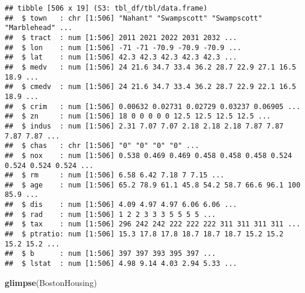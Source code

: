 \documentclass[
]{book}
\newenvironment{Shaded}{\begin{snugshade}}{\end{snugshade}}
\newcommand{\FunctionTok}[1]{\textcolor[rgb]{0.13,0.29,0.53}{\textbf{#1}}}
\newcommand{\NormalTok}[1]{#1}
\begin{document}
\begin{verbatim}
## tibble [506 x 19] (S3: tbl_df/tbl/data.frame)
##  $ town   : chr [1:506] "Nahant" "Swampscott" "Swampscott" "Marblehead" ...
##  $ tract  : num [1:506] 2011 2021 2022 2031 2032 ...
##  $ lon    : num [1:506] -71 -71 -70.9 -70.9 -70.9 ...
##  $ lat    : num [1:506] 42.3 42.3 42.3 42.3 42.3 ...
##  $ medv   : num [1:506] 24 21.6 34.7 33.4 36.2 28.7 22.9 27.1 16.5 18.9 ...
##  $ cmedv  : num [1:506] 24 21.6 34.7 33.4 36.2 28.7 22.9 22.1 16.5 18.9 ...
##  $ crim   : num [1:506] 0.00632 0.02731 0.02729 0.03237 0.06905 ...
##  $ zn     : num [1:506] 18 0 0 0 0 0 12.5 12.5 12.5 12.5 ...
##  $ indus  : num [1:506] 2.31 7.07 7.07 2.18 2.18 2.18 7.87 7.87 7.87 7.87 ...
##  $ chas   : chr [1:506] "0" "0" "0" "0" ...
##  $ nox    : num [1:506] 0.538 0.469 0.469 0.458 0.458 0.458 0.524 0.524 0.524 0.524 ...
##  $ rm     : num [1:506] 6.58 6.42 7.18 7 7.15 ...
##  $ age    : num [1:506] 65.2 78.9 61.1 45.8 54.2 58.7 66.6 96.1 100 85.9 ...
##  $ dis    : num [1:506] 4.09 4.97 4.97 6.06 6.06 ...
##  $ rad    : num [1:506] 1 2 2 3 3 3 5 5 5 5 ...
##  $ tax    : num [1:506] 296 242 242 222 222 222 311 311 311 311 ...
##  $ ptratio: num [1:506] 15.3 17.8 17.8 18.7 18.7 18.7 15.2 15.2 15.2 15.2 ...
##  $ b      : num [1:506] 397 397 393 395 397 ...
##  $ lstat  : num [1:506] 4.98 9.14 4.03 2.94 5.33 ...
\end{verbatim}

\begin{Shaded}
\begin{Highlighting}[]
\FunctionTok{glimpse}\NormalTok{(BostonHousing)}
\end{Highlighting}
\end{Shaded}
\end{document}
